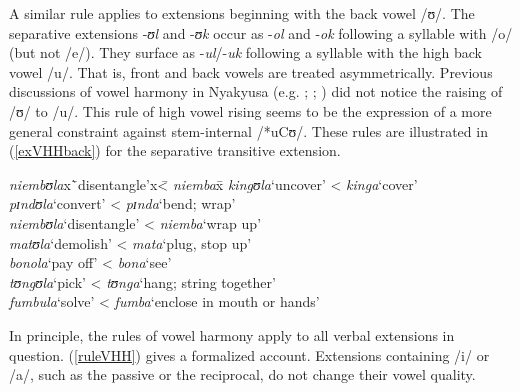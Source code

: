 A similar rule applies to extensions beginning with the back vowel /ʊ/. The separative extensions -\textit{ʊl} and -\textit{ʊk} occur as -\textit{ol} and -\textit{ok} following a syllable with /o/ (but not /e/). They surface as -\textit{ul}/-\textit{uk} following a syllable with the high back vowel /u/. That is, front and back vowels are treated asymmetrically. Previous discussions of vowel harmony in Nyakyusa (e.g. \citealt{MwangokaNVoorhoeveJ1960b}; \citealt{LabroussiC1998}; \citealt{HymanL1999}) did not notice the raising of /ʊ/ to /u/. This rule of high vowel rising seems to be the expression of a more general constraint against stem-internal /*uCʊ/. These rules are illustrated in (\ref{exVHHback}) for the separative transitive extension. 
\begin{exe}
\ex \label{exVHHback}
\begin{tabbing}
\textit{niembʊla}x\=`disentangle'x\= < \textit{niemba}x\=\kill%
\textit{kingʊla}\>`uncover'\> < \textit{kinga}\>`cover' \\
\textit{pɪndʊla}\>`convert'\> < \textit{pɪnda}\>`bend; wrap'\\
\textit{niembʊla}\>`disentangle'\> < \textit{niemba}\>`wrap up'\\
\textit{matʊla}\>`demolish'\> < \textit{mata}\>\lq plug, stop up'\\
\textit{bonola}\>`pay off'\> < \textit{bona}\>`see'\\
\textit{tʊngʊla}\>`pick'\> < \textit{tʊnga}\>`hang; string together'\\
\textit{fumbula}\>`solve'\> < \textit{fumba}\>`enclose in mouth or hands'
\end{tabbing}
\end{exe}

In principle, the rules of vowel harmony apply to all verbal extensions in question. (\ref{ruleVHH}) gives a formalized account. Extensions containing /i/ or /a/, such as the passive or the reciprocal, do not change their vowel quality. 

\begin{exe}
\ex \label{ruleVHH}
\\
 \\
\end{exe}

